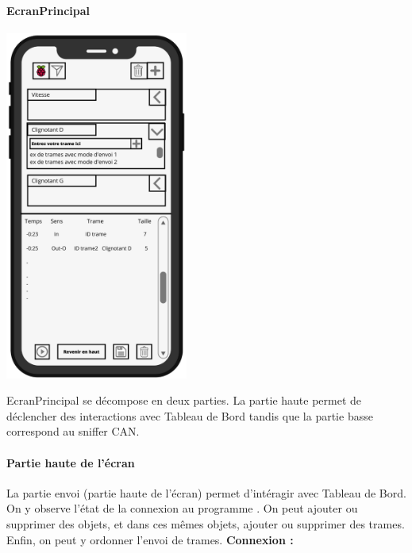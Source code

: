 \newpage
\paragraph{EcranPrincipal}

\vspace{1cm}
\begin{minipage}{1\linewidth}
    \centering
    \includegraphics[width=0.45\textwidth]{sections/3_Exigences_specifiques/1_IHM/ihm/ecranPrincipal.png}
    \captionsetup{justification=centering}
    \label{ecran_principal}
\end{minipage}\hfill
\newline
\newline
EcranPrincipal se décompose en deux parties. La partie haute permet de déclencher des interactions avec Tableau de Bord tandis que la partie basse correspond au sniffer CAN.
\medskip

\newpage
\paragraph{Partie haute de l'écran}
\medskip
La partie {\guillemetleft} envoi {\guillemetright} (partie haute de l'écran) permet d'intéragir avec Tableau de Bord. On y observe l'état de la connexion au programme {\nomLogiciel}. On peut ajouter ou supprimer des objets, et dans ces mêmes objets, ajouter ou supprimer des trames. Enfin, on peut y ordonner l'envoi de trames. 
\newline
\newline
\textbf{Connexion : } \\

